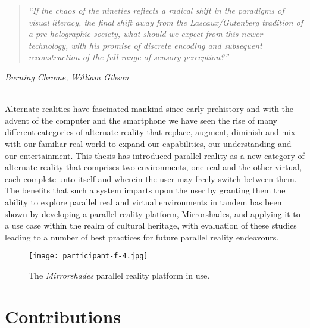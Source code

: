 \begin{quote}
	\textit{``If the chaos of the nineties reflects a radical shift in the paradigms of visual literacy, the final shift away from the Lascaux/Gutenberg tradition of a pre-holographic society, what should we expect from this newer technology, with his promise of discrete encoding and subsequent reconstruction of the full range of sensory perception?''}
\end{quote}
\hfill \textit{Burning Chrome, William Gibson}
\\
\\


\label{chapter-conclusions}

Alternate realities have fascinated mankind since early prehistory and with the advent of the computer and the smartphone we have seen the rise of many different categories of alternate reality that replace, augment, diminish and mix with our familiar real world to expand our capabilities, our understanding and our entertainment. This thesis has introduced parallel reality as a new category of alternate reality that comprises two environments, one real and the other virtual, each complete unto itself and wherein the user may freely switch between them. The benefits that such a system imparts upon the user by granting them the ability to explore parallel real and virtual environments in tandem has been shown by developing a parallel reality platform, Mirrorshades, and applying it to a use case within the realm of cultural heritage, with evaluation of these studies leading to a number of best practices for future parallel reality endeavours.

\begin{figure}[h]
	\begin{center}
		\texttt{[image: participant-f-4.jpg]}
		\caption{The \textit{Mirrorshades} parallel reality platform in use.}
		\label{participant-f-4.jpg}
	\end{center}	
\end{figure}


\section{Contributions}

